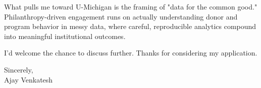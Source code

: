 \documentclass[letterpaper,11pt]{article}
\begin{document}
What pulls me toward U-Michigan is the framing of "data for the common good." Philanthropy-driven engagement runs on actually understanding donor and program behavior in messy data, where careful, reproducible analytics compound into meaningful institutional outcomes.

I'd welcome the chance to discuss further. Thanks for considering my application.

\vspace{12pt}
Sincerely, \\
Ajay Venkatesh
\end{document}
